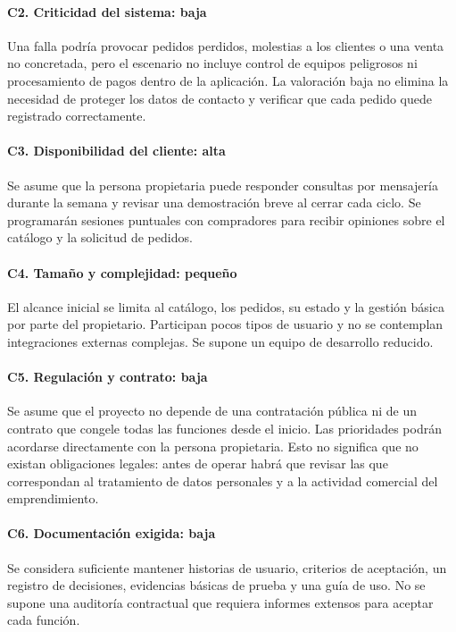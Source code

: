 \paragraph{C2. Criticidad del sistema: baja}
Una falla podría provocar pedidos perdidos, molestias a los clientes o una
venta no concretada, pero el escenario no incluye control de equipos
peligrosos ni procesamiento de pagos dentro de la aplicación. La valoración
baja no elimina la necesidad de proteger los datos de contacto y verificar
que cada pedido quede registrado correctamente.

\paragraph{C3. Disponibilidad del cliente: alta}
Se asume que la persona propietaria puede responder consultas por mensajería
durante la semana y revisar una demostración breve al cerrar cada ciclo. Se
programarán sesiones puntuales con compradores para recibir opiniones sobre
el catálogo y la solicitud de pedidos.

\paragraph{C4. Tamaño y complejidad: pequeño}
El alcance inicial se limita al catálogo, los pedidos, su estado y la
gestión básica por parte del propietario. Participan pocos tipos de usuario
y no se contemplan integraciones externas complejas. Se supone un equipo de
desarrollo reducido.

\paragraph{C5. Regulación y contrato: baja}
Se asume que el proyecto no depende de una contratación pública ni de un
contrato que congele todas las funciones desde el inicio. Las prioridades
podrán acordarse directamente con la persona propietaria. Esto no significa
que no existan obligaciones legales: antes de operar habrá que revisar las
que correspondan al tratamiento de datos personales y a la actividad
comercial del emprendimiento.

\paragraph{C6. Documentación exigida: baja}
Se considera suficiente mantener historias de usuario, criterios de
aceptación, un registro de decisiones, evidencias básicas de prueba y una
guía de uso. No se supone una auditoría contractual que requiera informes
extensos para aceptar cada función.

